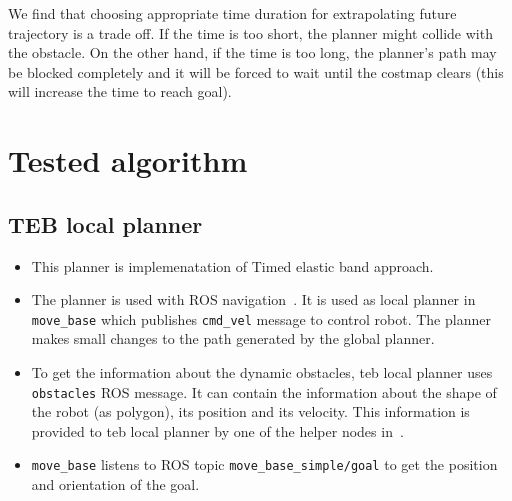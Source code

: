     We find that choosing appropriate time duration for extrapolating future trajectory is a trade
    off. If the time is too short, the planner might collide with the obstacle. On the other
    hand, if the time is too long, the planner's path may be blocked completely and it will be forced
    to wait until the costmap clears (this will increase the time to reach goal). 

\section{Tested algorithm}
\subsection{TEB local planner}%
\label{sub:teb_local_planner}

\begin{itemize}
    \item This planner\cite{tebLocalPlanner} is implemenatation of Timed elastic band 
        approach\cite{rosmann2015planning}.
    \item The planner is used with ROS navigation~\cite{rosnavigation}. It is used as local
        planner in \texttt{move\_base} which publishes \texttt{cmd\_vel} message to control robot. 
        The planner makes small changes to the path generated by the global planner.
    \item To get the information about the dynamic obstacles, teb local planner uses \texttt{obstacles} 
        ROS message. It can contain the information about the shape of the robot (as polygon), its
        position and its velocity. This information is provided to teb local planner by one of the
        helper nodes in~\cite{movingObstacleGazebo}.
    \item \texttt{move\_base} listens to ROS topic \texttt{move\_base\_simple/goal} to get the position
        and orientation of the goal.
\end{itemize}

